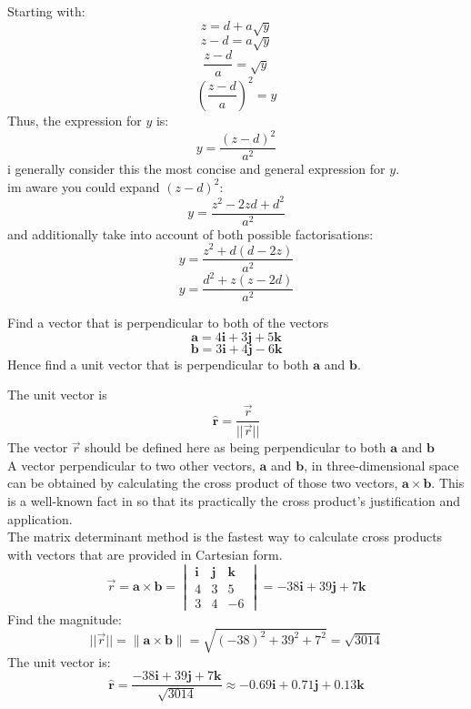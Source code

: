 \documentclass[a4paper, 12pt]{report}
\def\ni{blue!20!white}
\begin{document}
    Starting with:
    \[z = d + a\sqrt{y}\]
    \[z - d = a\sqrt{y}\]
    \[\frac{z - d}{a} = \sqrt{y}\]
    \[\left( \frac{z - d}{a} \right)^2 = y\]
    Thus, the expression for \( y \) is:
    \[\boxed{y = \frac{(z - d)^2}{a^2}}\]
    i generally consider this the most concise and general expression for $y$.\\
    im aware you could expand \( (z - d)^2 \):
    \[y = \frac{z^2 - 2zd + d^2}{a^2}\]
    and additionally take into account of both possible factorisations:
    \[y = \frac{z^2+d(d-2z)}{a^2}\]
    \[y = \frac{d^2+z(z-2d)}{a^2}\]    
    
    \newpage
    \begin{tcolorbox}[title=\color{black}{\section{Q7}}, colback=white, colframe=\ni, boxrule=1mm, width=1\textwidth]
        Find a vector that is perpendicular to both of the vectors $$ \boldsymbol{a}=4 \mathbf{i}+3 \mathbf{j}+5 \mathbf{k} $$$$ \boldsymbol{b}=3 \mathbf{i}+4 \mathbf{j}-6 \mathbf{k} $$ Hence find a unit vector that is perpendicular to both \( \boldsymbol{a} \) and \( \boldsymbol{b} \).
    \end{tcolorbox}
    The unit vector is
    \[\mathbf{\hat{r}} =\frac{\vec{r}}{||{\vec{r}}||}\]
    The vector $\vec{r}$ should be defined here as being perpendicular to both $\bm{a}$ and $\bm{b}$\\[8pt]
    A vector perpendicular to two other vectors, $\bm{a}$ and $\bm{b}$, in three-dimensional space can be obtained by calculating the cross product of those two vectors, $\bm{a} \times \bm{b}$. This is a well-known fact in so that its practically the cross product's justification and application.\\[8pt]
    The matrix determinant method is the fastest way to calculate cross products with vectors that are provided in Cartesian form. 
    \[\vec{r}=\mathbf{a} \times \mathbf{b} = \begin{vmatrix} \mathbf{i} & \mathbf{j} & \mathbf{k} \\ 4 & 3 & 5 \\ 3 & 4 & -6 \end{vmatrix}= -38\mathbf{i} + 39\mathbf{j} + 7\mathbf{k}\]
    Find the magnitude:
    \[||{\vec{r}}||=\|\mathbf{a} \times \mathbf{b}\| = \sqrt{(-38)^2 + 39^2 + 7^2} = \sqrt{3014}\]
    The unit vector is:
    \[\boxed{\mathbf{\hat{r}}=\frac{-38\mathbf{i} + 39\mathbf{j} + 7\mathbf{k}}{\sqrt{3014}}\approx-0.69\mathbf{i}+0.71\mathbf{j}+0.13\mathbf{k}}\]
   
\end{document}
